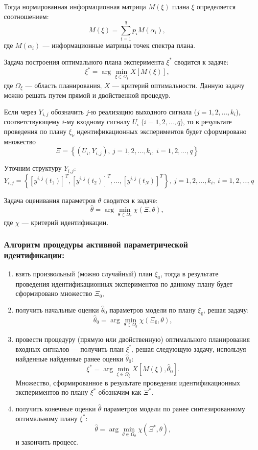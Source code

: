 \documentclass[a4paper,14pt]{extarticle}
\begin{document}
Тогда нормированная информационная матрица $M(\xi)$ плана $\xi$ определяется
соотношением:
\[
	M(\xi) = \sum\limits_{i=1}^q p_i M(\alpha_i),
\]
где $M(\alpha_i)$ --- информационные матрицы точек спектра плана.

Задача построения оптимального плана эксперимента $\xi^*$ сводится к задаче:
\[
	\xi^* = \arg \min\limits_{\xi \in \Omega_{\xi}} X[M(\xi)],
\]
где $\Omega_{\xi}$ --- область планирования, $X$ --- критерий оптимальности.
Данную задачу можно решать путем прямой и двойственной процедур.

Если через $Y_{i,j}$ обозначить $j$-ю реализацию выходного сигнала ($j = 1, 2,
\ldots, k_i$), соответствующему $i$-му входному сигналу $U_i$ ($i = 1, 2,
\ldots, q$), то в результате проведения по плану $\xi_{\nu}$ идентификационных
экспериментов будет сформировано множество
\[
	\Xi = \left\{ 
		(U_i, Y_{i,j}),\ j = 1, 2, \ldots, k_i,\ i = 1, 2, \ldots, q
	\right\}
\]

Уточним структуру $Y_{i,j}$:
\[
	Y_{i,j}	= \left\{ 
		[y^{i,j}(t_1)]^T, [y^{i,j}(t_2)]^T, \ldots, [y^{i,j}(t_N)]^T \right\},\
		j = 1, 2, \ldots, k_i,\ i = 1, 2, \ldots, q
\]

Задача оценивания параметров $\theta$ сводится к задаче:
\[
	\hat{\theta} = \arg \min\limits_{\theta \in \Omega_{\theta}} \chi(\Xi,
	\theta),
\]
где $\chi$ --- критерий идентификации.

\subsubsection{Алгоритм процедуры активной параметрической идентификации:}

\begin{enumerate}
	\item взять произвольный (можно случайный) план $\xi_0$,
		тогда в результате проведения идентификационных экспериментов по данному
		плану будет сформировано множество $\Xi_0$,
	\item получить начальные оценки $\hat{\theta}_0$ параметров модели
		по плану $\xi_0$, решая задачу:
\[
	\hat{\theta}_0 = \arg\min\limits_{\theta \in \Omega_{\theta}}
		\chi(\Xi_0, \theta),
\]
	\item провести процедуру (прямую или двойственную) оптимального планирования
		входных сигналов --- получить план $\xi^{*}$, решая следующую задачу,
		используя найденные найденные ранее оценки $\hat{\theta}_0$:
\[
	\xi^{*} = \arg\min\limits_{\xi \in \Omega_{\xi}} X[M(\xi), \hat{\theta}_0].
\]
	Множество, сформированное в результате проведения идентификационных
		экспериментов по плану $\xi^{*}$ обозначим как $\Xi^{*}$.
	\item получить конечные оценки $\hat{\theta}$ параметров модели по ранее
		синтезированному оптимальному плану $\xi^{*}$:
\[
	\hat{\theta} = \arg\min\limits_{\theta \in \Omega_{\theta}} \chi(\Xi^{*},
		\theta),
\]
и закончить процесс.

\end{enumerate}
\end{document}
